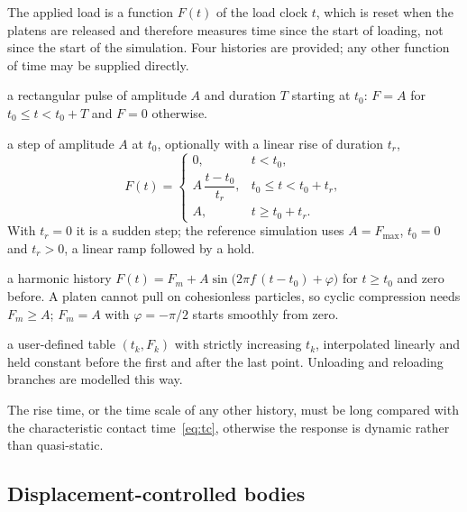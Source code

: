 The applied load is a function $F(t)$ of the load clock $t$, which is reset when
the platens are released and therefore measures time since the start of loading,
not since the start of the simulation.  Four histories are provided; any other
function of time may be supplied directly.
\begin{description}[leftmargin=1.6em,style=nextline]
  \item[Pulse] a rectangular pulse of amplitude $A$ and duration $T$ starting at
        $t_{0}$: $F=A$ for $t_{0}\le t<t_{0}+T$ and $F=0$ otherwise.
  \item[Heaviside] a step of amplitude $A$ at $t_{0}$, optionally with a linear
        rise of duration $t_{r}$,
        \begin{equation}
          F(t) =
          \begin{cases}
            0, & t < t_{0},\\[2pt]
            A\,\dfrac{t-t_{0}}{t_{r}}, & t_{0}\le t<t_{0}+t_{r},\\[6pt]
            A, & t\ge t_{0}+t_{r}.
          \end{cases}
          \label{eq:ramp}
        \end{equation}
        With $t_{r}=0$ it is a sudden step; the reference simulation uses
        $A=F_{\max}$, $t_{0}=0$ and $t_{r}>0$, a linear ramp followed by a
        hold.
  \item[Sinusoidal] a harmonic history
        $F(t)=F_{m}+A\sin\bigl(2\pi f\,(t-t_{0})+\varphi\bigr)$ for $t\ge t_{0}$
        and zero before.  A platen cannot pull on cohesionless particles, so
        cyclic compression needs $F_{m}\ge A$; $F_{m}=A$ with
        $\varphi=-\pi/2$ starts smoothly from zero.
  \item[Time history] a user-defined table $(t_{k},F_{k})$ with strictly
        increasing $t_{k}$, interpolated linearly and held constant before the
        first and after the last point.  Unloading and reloading branches are
        modelled this way.
\end{description}
The rise time, or the time scale of any other history, must be long compared
with the characteristic contact time~\eqref{eq:tc}, otherwise the response is
dynamic rather than quasi-static.

\subsection{Displacement-controlled bodies}
\label{sec:prescribed-platen}

